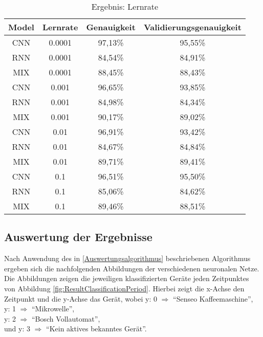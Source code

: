         \begin{table}[H]
            \centering
            \begin{tabular}{|c|c|c|c|}
                \hline
                Model & Lernrate & Genauigkeit & Validierungsgenauigkeit \\
                \hline
                CNN & 0.0001 & 97,13\% & 95,55\% \\
                \hline
                RNN & 0.0001 & 84,54\% & 84,91\% \\
                \hline
                MIX & 0.0001 & 88,45\% & 88,43\% \\
                \hline
                \hline
                CNN & 0.001  & 96,65\% & 93,85\% \\
                \hline
                RNN & 0.001  & 84,98\% & 84,34\% \\
                \hline
                MIX & 0.001  & 90,17\% & 89,02\% \\
                \hline
                \hline
                CNN & 0.01   & 96,91\% & 93,42\% \\
                \hline
                RNN & 0.01   & 84,67\% & 84,84\% \\
                \hline
                MIX & 0.01   & 89,71\% & 89,41\% \\
                \hline
                \hline
                CNN & 0.1    & 96,51\% & 95,50\% \\
                \hline
                RNN & 0.1    & 85,06\% & 84,62\% \\
                \hline
                MIX & 0.1    & 89,46\% & 88,51\% \\
                \hline
            \end{tabular}
            \caption{Ergebnis: Lernrate}
            \label{tabl:ErgebnisLernrate}
        \end{table}   


    \subsection{Auswertung der Ergebnisse}

        Nach Anwendung des in \ref{Auswertungsalgorithmus} beschriebenen Algorithmus ergeben sich die nachfolgenden Abbildungen der verschiedenen neuronalen Netze.
        Die Abbildungen zeigen die jeweiligen klassifizierten Geräte jeden Zeitpunktes von Abbildung \ref{fig:ResultClassificationPeriod}.
        Hierbei zeigt die x-Achse den Zeitpunkt und die y-Achse das Gerät, wobei 
        y: 0 \( \Rightarrow \)  "`Senseo Kaffeemaschine"',\\
        \noindent
        y: 1 \( \Rightarrow \)  "`Mikrowelle"',\\
        \noindent
        y: 2 \( \Rightarrow \)  "`Bosch Vollautomat"',\\
        \noindent
        und y: 3 \( \Rightarrow \) "`Kein aktives bekanntes Gerät"'.
        \\
        
